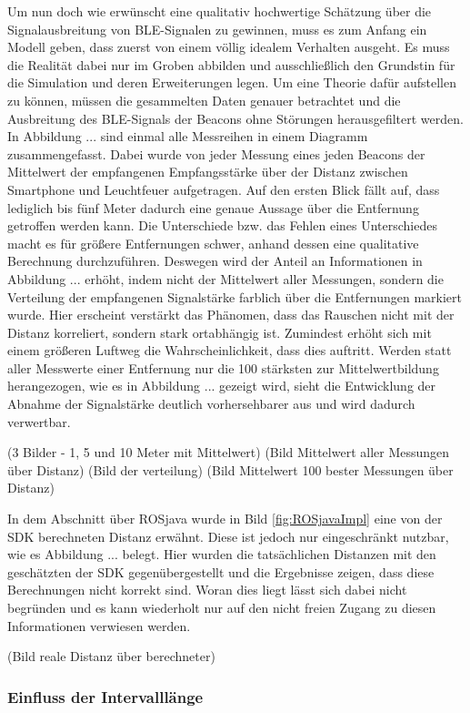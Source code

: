 Um nun doch wie erwünscht eine qualitativ hochwertige Schätzung über die Signalausbreitung von BLE-Signalen zu gewinnen, muss es zum Anfang ein Modell geben, dass zuerst von einem völlig idealem Verhalten ausgeht. Es muss die Realität dabei nur im Groben abbilden und ausschließlich den Grundstin für die Simulation und deren Erweiterungen legen. Um eine Theorie dafür aufstellen zu können, müssen die gesammelten Daten genauer betrachtet und die Ausbreitung des BLE-Signals der Beacons ohne Störungen herausgefiltert werden. In Abbildung ... sind einmal alle Messreihen in einem Diagramm zusammengefasst. Dabei wurde von jeder Messung eines jeden Beacons der Mittelwert der empfangenen Empfangsstärke über der Distanz zwischen Smartphone und Leuchtfeuer aufgetragen. Auf den ersten Blick  fällt auf, dass lediglich bis fünf Meter dadurch eine genaue Aussage über die Entfernung getroffen werden kann. Die Unterschiede bzw. das Fehlen eines Unterschiedes macht es für größere Entfernungen schwer, anhand dessen eine qualitative Berechnung durchzuführen. Deswegen wird der Anteil an Informationen in Abbildung ... erhöht, indem nicht der Mittelwert aller Messungen, sondern die Verteilung der empfangenen Signalstärke farblich über die Entfernungen markiert wurde. Hier erscheint verstärkt das Phänomen, dass das Rauschen nicht mit der Distanz korreliert, sondern stark ortabhängig ist. Zumindest erhöht sich mit einem größeren Luftweg die Wahrscheinlichkeit, dass dies auftritt. Werden statt aller Messwerte einer Entfernung nur die 100 stärksten zur Mittelwertbildung herangezogen, wie es in Abbildung ... gezeigt wird, sieht die Entwicklung der Abnahme der Signalstärke deutlich vorhersehbarer aus und wird dadurch verwertbar. 

(3 Bilder - 1, 5 und 10 Meter mit Mittelwert) 
(Bild Mittelwert aller Messungen über Distanz)
(Bild der verteilung)
(Bild Mittelwert 100 bester Messungen über Distanz)

In dem Abschnitt über ROSjava wurde in Bild \ref{fig:ROSjavaImpl} eine von der SDK berechneten Distanz erwähnt. Diese ist jedoch nur eingeschränkt nutzbar, wie es Abbildung ... belegt. Hier wurden die tatsächlichen Distanzen mit den geschätzten der SDK gegenübergestellt und die Ergebnisse zeigen, dass diese Berechnungen nicht korrekt sind. Woran dies liegt lässt sich dabei nicht begründen und es kann wiederholt nur auf den nicht freien Zugang zu diesen Informationen verwiesen werden.

(Bild reale Distanz über berechneter)

\subsubsection{Einfluss der Intervalllänge} 
